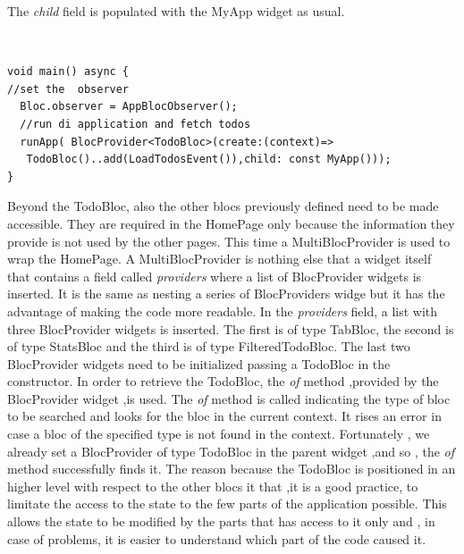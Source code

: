 The \textit{child} field is populated with the MyApp widget as usual.
\begin{code}
\mbox{}\\
 \mbox{}
\label{code:2.14}
\begin{verbatim}
void main() async {
//set the  observer
  Bloc.observer = AppBlocObserver();
  //run di application and fetch todos
  runApp( BlocProvider<TodoBloc>(create:(context)=>
   TodoBloc()..add(LoadTodosEvent()),child: const MyApp()));
}
\end{verbatim}
\mbox{}
\end{code}

Beyond the TodoBloc, also the other blocs previously defined need to be made accessible. They are required in the HomePage only because the information they provide is not used by the other pages. This time a MultiBlocProvider is used to wrap the HomePage.  A MultiBlocProvider is nothing else that a widget itself that contains a field called \textit{providers} where a list of BlocProvider widgets is inserted.  It is the same as nesting a series of BlocProviders widge but it has the advantage of making the code more readable. In the \textit{providers} field, a list with three BlocProvider widgets is inserted. The first is of type TabBloc, the second is of type StatsBloc and the third is of type FilteredTodoBloc. The last two BlocProvider widgets need to be initialized passing a TodoBloc in the constructor. In order to retrieve the TodoBloc, the \textit{of }method ,provided by the BlocProvider widget ,is used. The \textit{of} method is called indicating the type of bloc to be searched and looks for the bloc in the current context. It rises an error in case a bloc of the specified type is not found in the context. Fortunately , we already set a BlocProvider of type TodoBloc in the parent widget ,and so , the \textit{of} method successfully finds it. The reason because the TodoBloc is positioned in an higher level with respect to the other blocs it that ,it is a good practice, to limitate the access to the state to the few parts of the application possible. This allows the state to be modified by the parts that has access to it only and , in case of problems, it is easier to  understand which part of the code caused it.
